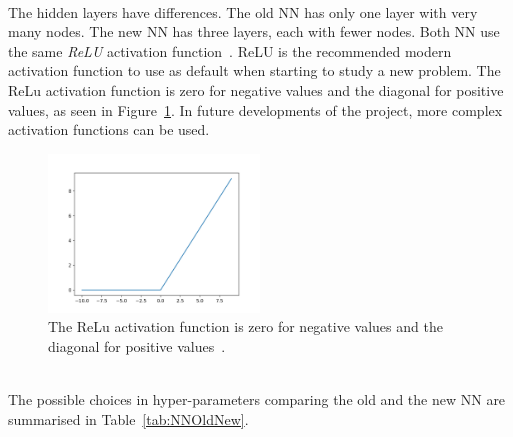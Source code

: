 \ \\The hidden layers have differences. The old NN has only one layer with very many nodes. The new NN has three layers, each with fewer nodes. Both NN use the same \emph{ReLU} activation function~\cite{ReLU}. ReLU is the recommended modern activation function to use as default when starting to study a new problem. The ReLu activation function is zero for negative values and the diagonal for positive values, as seen in Figure~\ref{fig:ReLU}. In future developments of the project, more complex activation functions can be used.

\begin{figure}[h]
  \centering
  \includegraphics[width=0.5\textwidth]{./plots/ReLU.png}
  \caption{The ReLu activation function is zero for negative values and the diagonal for positive values~\cite{ReLU}.}
  \label{fig:ReLU}
\end{figure} 

\ \\The possible choices in hyper-parameters comparing the old and the new NN are summarised in Table~\ref{tab:NNOldNew}.

\begin{table}[h!]
\caption {NN architecture and hyper-parameters comparing for the old NN, suggested in the toy data paper, and the new NN, from the optimisation of this study.}
\label{tab:NNOldNew}
\end{table}

